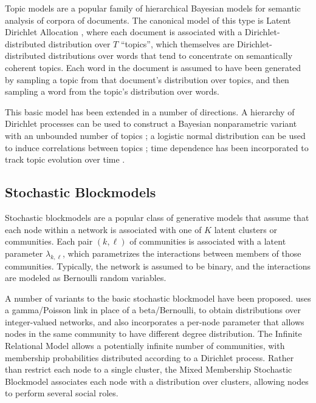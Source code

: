         Topic models are a popular family of hierarchical Bayesian models for semantic analysis of corpora of documents.  The canonical model of this type is Latent Dirichlet Allocation \cite{blei2003LDA}, where each document is associated with a Dirichlet-distributed distribution over $T$ ``topics'', which themselves are Dirichlet-distributed distributions over words that tend to concentrate on semantically coherent topics. Each word  in the  document is assumed to have been generated by sampling a topic from that document's distribution over topics, and then sampling a word from the topic's distribution over words. 
        
        This basic model has been extended in a number of directions. A hierarchy of Dirichlet processes can be used to construct a Bayesian nonparametric variant with an unbounded number of topics \citep{Teh:2007}; a logistic normal distribution can be used to induce correlations between topics \citep{ctm}; time dependence has been incorporated to track topic evolution over time \citep{blei2006dynamic}.
    
    \subsection{Stochastic Blockmodels} \label{sec:intro_sbm}
    
    
        Stochastic blockmodels \citep{Wang:Wong:1987,Snijders:Nowicki:1997} are a popular class of generative models that assume that each node within a network is associated with one of $K$ latent clusters or communities. Each pair $(k,\ell)$ of communities is associated with a latent parameter $\lambda_{k,\ell}$, which parametrizes the interactions between members of those communities. Typically, the network is assumed to be binary, and the interactions are modeled as Bernoulli random variables.
        
        A number of variants to the basic stochastic blockmodel have been proposed. \citep{Karrer:Newman:2011} uses a gamma/Poisson link in place of a beta/Bernoulli, to obtain distributions over integer-valued networks, and also incorporates a per-node parameter that allows nodes in the same community to have different degree distribution. The Infinite Relational Model \citep{irm} allows a potentially infinite number of communities, with membership probabilities distributed according to a Dirichlet process. Rather than restrict each node to a single cluster, the Mixed Membership Stochastic Blockmodel \citep{Airoldi:Blei:Fienberg:Xing:2008} associates each node with a distribution over clusters, allowing nodes to perform several social roles.
    
